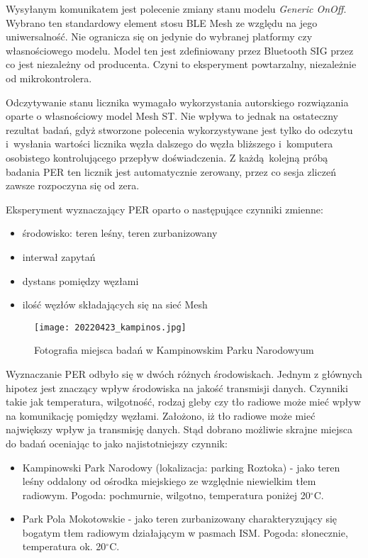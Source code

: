 Wysyłanym komunikatem jest polecenie zmiany stanu modelu
\textit{Generic OnOff}. Wybrano ten standardowy element stosu BLE Mesh ze względu na jego uniwersalność.
Nie ogranicza się on jedynie do wybranej platformy czy własnościowego modelu. Model ten jest zdefiniowany
przez Bluetooth SIG przez co jest niezależny od producenta. Czyni to eksperyment powtarzalny,
niezależnie od mikrokontrolera.

Odczytywanie stanu licznika wymagało wykorzystania autorskiego rozwiązania oparte o własnościowy model Mesh
ST. Nie wpływa to jednak na ostateczny rezultat badań, gdyż stworzone polecenia wykorzystywane jest
tylko do odczytu i~wysłania wartości licznika węzła dalszego do węzła bliższego i~komputera osobistego kontrolującego
przepływ doświadczenia. Z każdą kolejną próbą badania PER ten licznik jest automatycznie zerowany,
przez co sesja zliczeń zawsze rozpoczyna się od zera.

Eksperyment wyznaczający PER oparto o następujące czynniki zmienne:
\begin{itemize}
\item środowisko: teren leśny, teren zurbanizowany
\item interwał zapytań
\item dystans pomiędzy węzłami
\item ilość węzłów składających się na sieć Mesh
\end{itemize}


\begin{figure}[!ht]
	\centering \texttt{[image: 20220423\_kampinos.jpg]} 
	\caption{Fotografia miejsca badań w Kampinowskim Parku Narodowyum}
	\label{rys:kampinowski}
\end{figure}

Wyznaczanie PER odbyło się w dwóch różnych środowiskach. Jednym z głównych hipotez jest znaczący wpływ
środowiska na jakość transmisji danych. Czynniki takie jak temperatura, wilgotność, rodzaj gleby czy
tło radiowe może mieć wpływ na komunikację pomiędzy węzłami. Założono, iż tło radiowe może mieć
największy wpływ ja transmisję danych. Stąd dobrano możliwie skrajne miejsca do badań oceniając
to jako najistotniejszy czynnik:
\begin{itemize}
\item Kampinowski Park Narodowy (lokalizacja: parking Roztoka) - jako teren leśny oddalony od ośrodka miejskiego
ze względnie niewielkim tłem radiowym. Pogoda: pochmurnie, wilgotno, temperatura poniżej 20$^{\circ}$C.
\item Park Pola Mokotowskie - jako teren zurbanizowany charakteryzujący się bogatym tłem radiowym działającym
w pasmach \gls{ISM}. Pogoda: słonecznie, temperatura ok. 20$^{\circ}$C.
\end{itemize}

